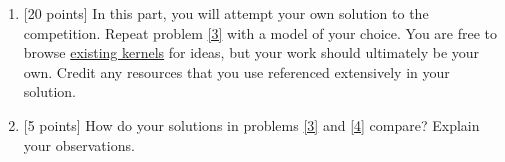 \documentclass[12pt]{article}
\newenvironment{problem}[2][Problem:]{\begin{trivlist}
\item[\hskip \labelsep {\bfseries #1}\hskip \labelsep {\bfseries #2.}]}{\end{trivlist}}
\begin{document}
\begin{problem}{Porto Seguro Dataset [75 points]}
\begin{enumerate}
    \item {[20 points]} \label{4}
    In this part, you will attempt your own solution to the competition. 
    Repeat problem \ref{3} with a model of your choice.
    You are free to browse \href{https://www.kaggle.com/c/porto-seguro-safe-driver-prediction/kernels}{existing kernels} for ideas, but your work should ultimately be your own. 
    Credit any resources that you use referenced extensively in your solution.
    
    \item {[5 points]}
    How do your solutions in problems \ref{3} and \ref{4} compare? Explain your observations. 



\end{enumerate}
\end{problem}
\end{document}
